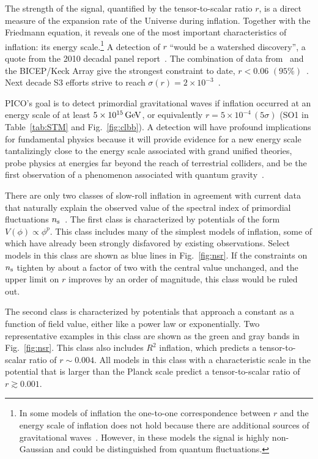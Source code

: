 \documentclass[PICOReport.tex]{subfiles}
\begin{document}
The strength of the signal, quantified by the tensor-to-scalar ratio $r$, is a direct measure of the expansion rate of the Universe during inflation. Together with the Friedmann equation, it reveals one of the most important characteristics of inflation: its energy scale.\footnote{In some models of inflation the one-to-one correspondence between $r$ and the energy scale of inflation does not hold because there are additional sources of gravitational waves~\cite{Namba:2015gja}. However, in these models the signal is highly non-Gaussian and could be distinguished from quantum fluctuations.}  A detection of $r$  ``would be a watershed discovery'', a quote from the 2010 decadal panel report~\citep{blandford2010}. The combination of data from \planck\ and the BICEP/Keck Array give the strongest constraint to date, $r<0.06\,\, (95\%)$~\citep{bicep_keck2018}. Next decade S3 efforts strive to reach $\sigma(r)=2 \times10^{-3}$~\citep{SOscience, biceparray}.

PICO's goal is to detect primordial gravitational waves if inflation occurred at an energy scale of at least $5\times 10^{15}\,\rm{GeV}$, or equivalently $r= 5\times 10^{-4} \, (5\sigma)$ (SO1 in Table~\ref{tab:STM} and Fig.~\ref{fig:clbb}). 
A detection will have profound implications for fundamental physics because it will provide evidence for a new energy scale tantalizingly close to the energy scale associated with grand unified theories, probe physics at energies far beyond the reach of terrestrial colliders, and be the first observation of a phenomenon associated with quantum gravity~\cite{Krauss:2013pha}.

There are only two classes of slow-roll inflation in agreement with current data that naturally explain the observed value of the spectral index of primordial fluctuations $n_{\rm s}$~\cite{Aghanim:2018eyx}. The first class is characterized by potentials of the form $V(\phi)\propto\phi^p$. This class includes many of the simplest models of inflation, some of which have already been strongly disfavored by existing observations. Select models in this class are shown as blue lines in Fig.~\ref{fig:nsr}. If the constraints on $n_{\rm s}$ tighten by about a factor of two with the central value unchanged, and the upper limit on $r$ improves by an order of magnitude, this class would be ruled out. 

The second class is characterized by potentials that approach a constant as a function of field value, either like a power law or exponentially. Two representative examples in this class are shown as the green and gray bands in Fig.~\ref{fig:nsr}. This class also includes $R^2$ inflation, which predicts a tensor-to-scalar ratio of $r\sim 0.004$. All models in this class with a characteristic scale in the potential that is larger than the Planck scale predict a tensor-to-scalar ratio of $r\gtrsim 0.001$. 
\end{document}
